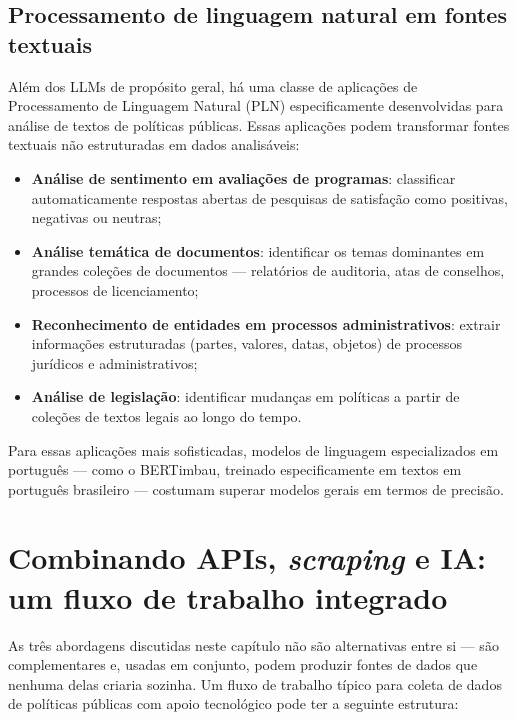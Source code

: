 \subsection{Processamento de linguagem natural em fontes textuais}

Além dos LLMs de propósito geral, há uma classe de aplicações de Processamento de Linguagem Natural (PLN) especificamente desenvolvidas para análise de textos de políticas públicas. Essas aplicações podem transformar fontes textuais não estruturadas em dados analisáveis:

\begin{itemize}
  \item \textbf{Análise de sentimento em avaliações de programas}: classificar automaticamente respostas abertas de pesquisas de satisfação como positivas, negativas ou neutras;
  \item \textbf{Análise temática de documentos}: identificar os temas dominantes em grandes coleções de documentos --- relatórios de auditoria, atas de conselhos, processos de licenciamento;
  \item \textbf{Reconhecimento de entidades em processos administrativos}: extrair informações estruturadas (partes, valores, datas, objetos) de processos jurídicos e administrativos;
  \item \textbf{Análise de legislação}: identificar mudanças em políticas a partir de coleções de textos legais ao longo do tempo.
\end{itemize}

Para essas aplicações mais sofisticadas, modelos de linguagem especializados em português --- como o BERTimbau, treinado especificamente em textos em português brasileiro --- costumam superar modelos gerais em termos de precisão.

\section{Combinando APIs, \textit{scraping} e IA: um fluxo de trabalho integrado}

As três abordagens discutidas neste capítulo não são alternativas entre si --- são complementares e, usadas em conjunto, podem produzir fontes de dados que nenhuma delas criaria sozinha. Um fluxo de trabalho típico para coleta de dados de políticas públicas com apoio tecnológico pode ter a seguinte estrutura:

